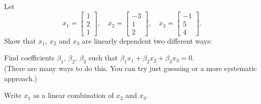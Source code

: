 \documentclass[minion]{homework}
\begin{document}
\begin{problems}
    \problem Let
    \[
        x_1= \begin{bmatrix} 1\\ 2 \\ 1\end{bmatrix},\quad
        x_2= \begin{bmatrix} -3\\ 1 \\ 2\end{bmatrix},\quad
        x_3= \begin{bmatrix} -1\\ 5 \\ 4\end{bmatrix}.
    \]
    Show that $x_1$, $x_2$ and $x_3$ are linearly dependent two different ways:
    \begin{subproblems}
        \item Find coefficients $\beta_1$, $\beta_2$, $\beta_3$ such that
        $\beta_1 x_1 + \beta_2 x_2 +\beta_3 x_3 = 0$. \\
        (There are many ways to do this. You can try just guessing or a more systematic approach.)
        \item Write $x_1$ as a linear combination of $x_2$ and $x_3$.
    \end{subproblems}


\end{problems}
\end{document}
